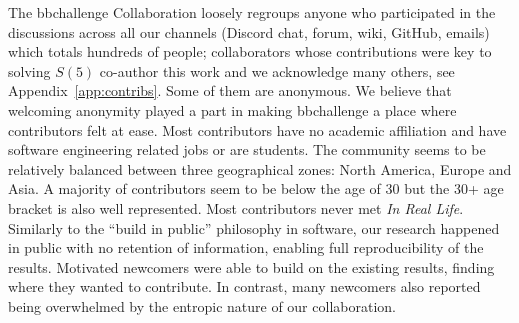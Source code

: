\documentclass[a4paper,british]{article}
\theoremstyle{definition} %
\numberwithin{equation}{section}
\theoremstyle{definition} %
\newcommand{\CoqBB}{Coq-BB5\xspace}
\begin{document}
The bbchallenge Collaboration loosely regroups anyone who participated in the discussions across all our channels (Discord chat, forum, wiki, GitHub, emails) which totals hundreds of people; collaborators whose contributions were key to solving $S(5)$ co-author this work and we acknowledge many others, see Appendix~\ref{app:contribs}.  Some of them are anonymous. We believe that welcoming anonymity played a part in making bbchallenge a place where contributors felt at ease. Most contributors have no academic affiliation and have software engineering related jobs or are students. The community seems to be relatively balanced between three geographical zones: North America, Europe and Asia. A majority of contributors seem to be below the age of 30 but the 30+ age bracket is also well represented. Most contributors never met \textit{In Real Life}. Similarly to the ``build in public'' philosophy in software, our research happened in public with no retention of information, enabling full reproducibility of the results. Motivated newcomers were able to build on the existing results, finding where they wanted to contribute. In contrast, many newcomers also reported being overwhelmed by the entropic nature of our collaboration.



\end{document}
